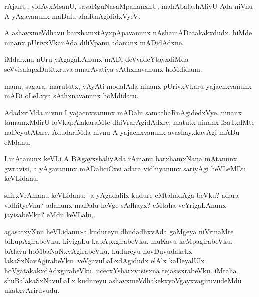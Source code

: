\documentclass{article}
\begin{document}
\begin{mn}%
rAjanU, vidAvxMsanU, savaRguNasaMpananxnU, mahAbalashAliyU Ada niVnu A yAgavanunx maDalu 
ahaRnAgididxVyeV.
\end{mn}

\begin{mn}%
A ashavxmeVdhavu barxhamxtAyxpApavanunx nAshamADatakakxdudx. hiMde ninanx pUrivxVkanAda 
diliVpanu adanunx mADidAdxne.
\end{mn}

\begin{mn}%
iMdarxnu nUru yAgagaLAnunx mADi deVvadeYtayxdiMda seVvisalapxDutitxruva amarAvatiya 
sAthxnavanunx hoMdidanu.
\end{mn}

\begin{mn}%
manu, sagara, marututx, yAyAti modalAda ninanx pUrivxVkaru yajacnxvanunx mADi oLeLxya 
sAthxnavanunx hoMdidaru.
\end{mn}

\begin{mn}%
AdadxriMda nivnu I yajacnxvanunx mADalu samathaRnAgidedxVye. ninanx tamamxMdirU 
loVkapAlakaraMte dhiVrarAgidAdxre. matutx ninanx iSaTxdMte naDeyutAtxre. AdudariMda nivnu A
yajacnxvanunx avashayxkavAgi mADu eMdanu.
\end{mn}

\begin{mn}%
I mAtanunx keVLi A BAgayxshaliyAda rAmanu barxhamxNana mAtanunx gwravisi, a yAgavanunx 
mADaliciCxsi adara vidhiyanunx sariyAgi heVLeMDu keVLidanu.
\end{mn}


\begin{mn}%
shirxVrAmanu keVLidanu:- a yAgadalilx kudure eMtahadAga beVku? adara vidhityeVnu? adanunx 
maDalu heVge sAdhayx? eMtaha veYrigaLAnunx jayisabeVku? eMdu keVLalu,
\end{mn}

\begin{mn}%
agasatxyXnu heVLidanu:-a kudureyu dhudadhxvAda gaMgeya niVrinaMte biLupAgirabeVku. 
kivigaLu kapApxgirabeVku. muKavu keMpagirabeVku. bAlavu hoMbaNaNxvAgirabeVku. kudureyu 
novDuvudakekx lakaSxNavAgirabeVku. veVgavuLaLxdAgidudx elAlx kaDeyalUlx 
hoVgatakakxdAdxgirabeVku. ucecxYsharxvasisxna tejasisxrabeVku. iMtaha shuBalakaSxNavuLaLx 
kudureyu ashavxmeVdhakekxyoVgayxvagiruvudeMdu ukatxvAriruvudu.
\end{mn}
\end{document}
